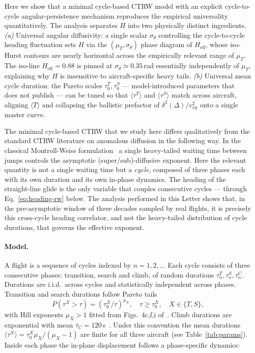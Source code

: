 \documentclass[10pt,twocolumn,a4paper]{article}
\begin{document}
Here we show that a minimal cycle-based CTRW model with an
explicit cycle-to-cycle angular-persistence mechanism reproduces
the empirical universality quantitatively. The analysis separates
$H$ into two physically distinct ingredients. \emph{(a)} Universal
angular diffusivity: a single scalar $\sigma_\theta$ controlling
the cycle-to-cycle heading fluctuation sets $H$ via the
$(\mu_T,\sigma_\theta)$ phase diagram of $H_{\mathrm{eff}}$, whose
iso-Hurst contours are nearly horizontal across the empirically
relevant range of $\mu_T$. The iso-line $H_{\mathrm{eff}}=0.88$ is
pinned at $\sigma_\theta\simeq 0.35$\,rad essentially
independently of $\mu_T$, explaining why $H$ is insensitive to
aircraft-specific heavy tails. \emph{(b)} Universal mean cycle
duration: the Pareto scales $\tau_0^T,\tau_0^S$ --- model-introduced
parameters that~\cite{vilpellet2026} does not publish --- can be
tuned so that $\langle\tau^T\rangle$ and $\langle\tau^S\rangle$
match across aircraft, aligning $\langle T\rangle$ and collapsing
the ballistic prefactor of $\delta^2(\Delta)/v_{xy}^2$ onto a single
master curve.

The minimal cycle-based CTRW that we study here differs
qualitatively from the standard CTRW literature on anomalous
diffusion in the following way. In the classical
Montroll-Weiss formulation~\cite{metzler2000} a single heavy-tailed
waiting time between jumps controls the asymptotic
(super/sub)-diffusive exponent. Here the relevant quantity is not a
single waiting time but a \emph{cycle}, composed of three phases
each with its own duration and its own in-phase dynamics. The
heading of the straight-line glide is the only variable that
couples consecutive cycles --- through Eq.~\eqref{eq:heading-rw}
below. The analysis performed in this Letter shows that, in the
pre-asymptotic window of three decades sampled by real flights, it
is precisely this cross-cycle heading correlator, and not the
heavy-tailed distribution of cycle durations, that governs the
effective exponent.

\paragraph*{Model.}
A flight is a sequence of cycles indexed by $n=1,2,\dots$ Each
cycle consists of three consecutive phases: transition, search and
climb, of random durations $\tau^T_n,\tau^S_n,\tau^C_n$. Durations
are i.i.d.\ across cycles and statistically independent across
phases. Transition and search durations follow Pareto tails
\begin{equation}
P(\tau^X>\tau)=(\tau_0^X/\tau)^{\mu_X},\quad \tau\ge\tau_0^X,
\quad X\in\{T,S\},
\label{eq:pareto}
\end{equation}
with Hill exponents $\mu_X>1$ fitted from Figs.~4c,f,i
of~\cite{vilpellet2026}. Climb durations are exponential with mean
$\bar{\tau}_C=120$\,s~\cite{vilpellet2026}. Under this convention
the mean durations $\langle\tau^X\rangle=\tau_0^X\mu_X/(\mu_X-1)$
are finite for all three aircraft (see Table~\ref{tab:params}).
Inside each phase the in-plane displacement follows a phase-specific
dynamics:
\end{document}
